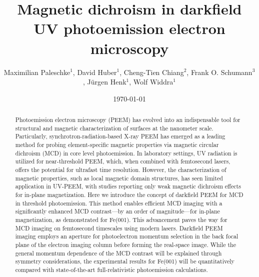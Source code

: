 \documentclass[prl,twocolumn,floatfix]{revtex4-2}
\begin{document}
\title{Magnetic dichroism in darkfield UV photoemission electron microscopy}
\author{Maximilian Paleschke$^{1}$, David Huber$^{1}$, Cheng-Tien Chiang$^2$, Frank O. Schumann$^3$, Jürgen Henk$^1$, Wolf Widdra$^1$}





\date{\today}

\begin{abstract}
    Photoemission electron microscopy (PEEM) has evolved into an indispensable tool for structural and magnetic characterization of surfaces at the nanometer scale. Particularly, synchrotron-radiation-based X-ray PEEM has emerged as a leading method for probing element-specific magnetic properties via magnetic circular dichroism (MCD) in core level photoemission. In laboratory settings, UV radiation is utilized for near-threshold PEEM, which, when combined with femtosecond lasers, offers the potential for ultrafast time resolution. However, the characterization of magnetic properties, such as local magnetic domain structures, has seen limited application in UV-PEEM, with studies reporting only weak magnetic dichroism effects for in-plane magnetization. 
    Here we introduce the concept of darkfield PEEM for MCD in threshold photoemission. This method enables efficient MCD imaging with a significantly enhanced MCD contrast—by an order of magnitude—for in-plane magnetization, as demonstrated for Fe(001). This advancement paves the way for MCD imaging on femtosecond timescales using modern lasers. Darkfield PEEM imaging employs an aperture for photoelectron momentum selection in the back focal plane of the electron imaging column before forming the real-space image. While the general momentum dependence of the MCD contrast will be explained through symmetry considerations, the experimental results for Fe(001) will be quantitatively compared with state-of-the-art full-relativistic photoemission calculations.
\end{abstract}

\pacs{}

\maketitle
\end{document}
